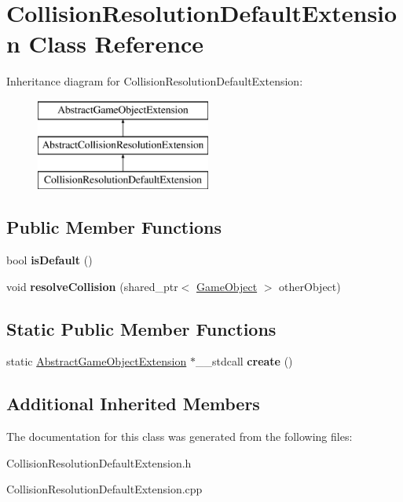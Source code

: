\hypertarget{class_collision_resolution_default_extension}{}\section{Collision\+Resolution\+Default\+Extension Class Reference}
\label{class_collision_resolution_default_extension}
Inheritance diagram for Collision\+Resolution\+Default\+Extension\+:\begin{figure}[H]
\begin{center}
\leavevmode
\includegraphics[height=3.000000cm]{class_collision_resolution_default_extension}
\end{center}
\end{figure}
\subsection*{Public Member Functions}
\begin{DoxyCompactItemize}
\item 
\mbox{\label{class_collision_resolution_default_extension_a68069b51c3b8c07186313d33eb9c9f4e}} 
bool {\bfseries is\+Default} ()
\item 
\mbox{\label{class_collision_resolution_default_extension_ae5b4ea88f403a4deb68ac2de309df4aa}} 
void {\bfseries resolve\+Collision} (shared\+\_\+ptr$<$ \mbox{\hyperlink{class_game_object}{Game\+Object}} $>$ other\+Object)
\end{DoxyCompactItemize}
\subsection*{Static Public Member Functions}
\begin{DoxyCompactItemize}
\item 
\mbox{\label{class_collision_resolution_default_extension_a6819e10299dd24e147b43971128a50f5}} 
static \mbox{\hyperlink{class_abstract_game_object_extension}{Abstract\+Game\+Object\+Extension}} $\ast$\+\_\+\+\_\+stdcall {\bfseries create} ()
\end{DoxyCompactItemize}
\subsection*{Additional Inherited Members}


The documentation for this class was generated from the following files\+:\begin{DoxyCompactItemize}
\item 
Collision\+Resolution\+Default\+Extension.\+h\item 
Collision\+Resolution\+Default\+Extension.\+cpp\end{DoxyCompactItemize}
